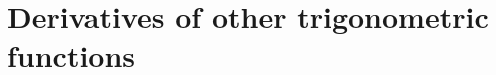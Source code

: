 \section{Derivatives of other trigonometric functions} \label{S:2.4.OtherTrig}



\newpage



\newpage



\newpage



\newpage